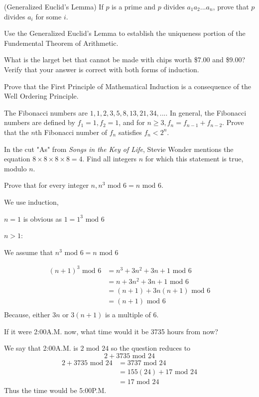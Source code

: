 \documentclass[11pt,largemargins]{homework}
\begin{document}
\question 
(Generalized Euclid's Lemma) If $p$ is a prime and $p$ divides $a_1a_2...a_n$, prove that $p$ divides $a_i$ for some $i$.

\question 
Use the Generalized Euclid's Lemma to establish the uniqueness portion of the Fundemental Theorem of Arithmetic.

\question What is the larget bet that cannot be made with chips worth \$7.00 and \$9.00? Verify that your answer is 
correct with both forms of induction.

\question 
Prove that the First Principle of Mathematical Induction is a consequence of the Well Ordering Principle.

\question 
The Fibonacci numbers are $1,1,2,3,5,8,13,21,34,...$. In general, the Fibonacci numbers are defined by $f_1=1, f_2=1$, and for 
$n\geq3, f_n=f_{n-1}+f_{n-2}$. Prove that the $n$th Fibonacci number of $f_n$ satisfies $f_n<2^n$.

\question 
In the cut "As" from \textit{Songs in the Key of Life}, Stevie Wonder mentions the equation $8\times8\times8\times8=4$. Find 
all integers $n$ for which this statement is true, modulo $n$.

\question 
Prove that for every integer $n, n^3\text{ mod }6=n\text{ mod }6$.

\quad We use induction,

\quad $n=1$ is obvious as $1=1^3\text{ mod }6$

\quad $n>1$:

We assume that $n^3\text{ mod }6=n\text{ mod }6$

\begin{align*}
    (n+1)^3\text{ mod }6 &= n^3+3n^2+3n+1\text{ mod }6\\
                         &= n + 3n^2+3n+1\text{ mod }6\\
                         &= (n+1) + 3n(n+1)\text{ mod }6\\
                         &= (n+1)\text{ mod }6\\
\end{align*}
\quad Because, either $3n$ or $3(n+1)$ is a multiple of 6.


\question 
If it were 2:00A.M. now, what time would it be 3735 hours from now?

\quad We say that 2:00A.M. is $2\text{ mod }24$ so the question reduces to 
$$2+3735\text{ mod }24$$
\begin{align*}
    2+3735\text{ mod }24 &= 3737\text{ mod }24\\
                         &= 155(24) + 17 \text{ mod }24\\
                         &= 17 \text{ mod }24
\end{align*}
\quad Thus the time would be 5:00P.M.
\end{document}

